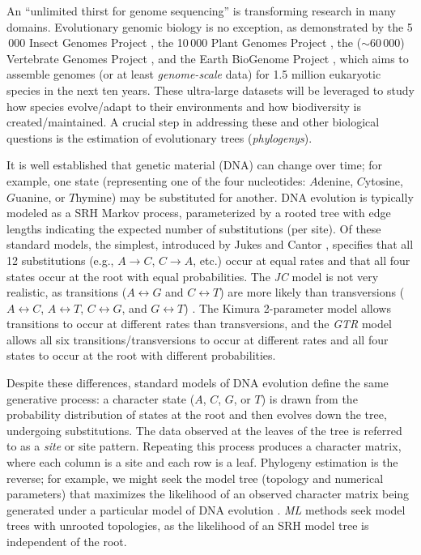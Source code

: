 An ``unlimited thirst for genome sequencing'' \cite{dhanapal2015international} is transforming research in many domains.
Evolutionary genomic biology is no exception, as demonstrated by the 5$\,$000 Insect Genomes Project \cite{levine2011i5k,i5K},  the 10$\,$000 Plant Genomes Project \cite{cheng201810kp}, the ($\sim$60$\,$000) Vertebrate Genomes Project \cite{vgp}, and the Earth BioGenome Project \cite{lewin2018earth}, which aims to assemble genomes (or at least {\em genome-scale} data) for 1.5 million eukaryotic species in the next ten years.
These ultra-large datasets will be leveraged to study how species evolve/adapt to their environments and how biodiversity is created/maintained.
A crucial step in addressing these and other biological questions is the estimation of evolutionary trees (\textit{\glspl{phylogeny}}).

It is well established that genetic material (DNA) can change over time; for example, one state (representing one of the four nucleotides: $A$denine, $C$ytosine, $G$uanine, or $T$hymine) may be substituted for another.
DNA evolution is typically modeled as a \gls{SRH} Markov process, parameterized by a rooted tree with edge lengths indicating the expected number of substitutions (per site).
Of these standard models, the simplest, introduced by Jukes and Cantor \cite{jukes1969evolution}, specifies that all 12 substitutions (e.g., $A \rightarrow C$, $C \rightarrow A$, etc.) occur at equal rates and that all four states occur at the root with equal probabilities.
The \textit{\gls{JC}} model is not very realistic, as transitions ($A \leftrightarrow G$ and $C \leftrightarrow T$) are more likely than transversions ($A \leftrightarrow C$, $A \leftrightarrow T$, $C \leftrightarrow G$, and $G \leftrightarrow T$) \cite{kimura1980simple}. 
The Kimura 2-parameter model \cite{kimura1980simple} allows transitions to occur at different rates than transversions, and the \textit{\Gls{GTR}} model \cite{tavare1986some} allows all six transitions/transversions to occur at different rates and all four states to occur at the root with different probabilities.

Despite these differences, standard models of DNA evolution define the same generative process: a character state ($A$, $C$, $G$, or $T$) is drawn from the probability distribution of states at the root and then evolves down the tree, undergoing substitutions.
The data observed at the leaves of the tree is referred to as a \textit{\gls{site}} or site pattern.
Repeating this process produces a character matrix, where each column is a site and each row is a leaf.
Phylogeny estimation is the reverse; for example, we might seek the model tree (topology and numerical parameters) that maximizes the likelihood of an observed character matrix being generated under a particular model of DNA evolution \cite{felsenstein1981evolutionary}.
\textit{\Gls{ML}} methods seek model trees with unrooted topologies, as the likelihood of an SRH model tree is independent of the root.

